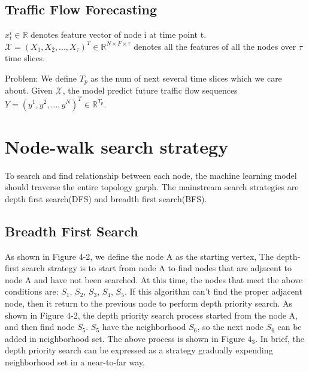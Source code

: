 \documentclass[conference]{IEEEtran}
\begin{document}
\subsection{Traffic Flow Forecasting}\label{AA}
\begin{math} x^i_t\in \mathbb{R}   \end{math} denotes feature vector of node i at time point t. \begin{math} \mathcal{X} = (X_1,X_2, ...,X_\tau)^T \in \mathbb{R}^{N\times F\times\tau}\end{math} denotes all the features of all the nodes over $\tau$ time slices.
\par Problem: We define $T_p$ as the num of next several time slices which we care about. Given $\mathcal{X}$, the model predict future traffic flow sequences $Y = (y^1,y^2,...,y^N)^T \in \mathbb{R} ^{T_p}$.

\section{Node-walk search strategy}
To search and find relationship between each node, the machine learning model should traverse the entire topology garph. The mainstream search strategies are depth first search(DFS) and breadth first search(BFS).

\subsection{Breadth First Search}
\par
As shown in Figure 4-2, we define the node A as the starting vertex, The depth-first search strategy is to start from node A to find nodes that are adjacent to node A and have not been searched. At this time, the nodes that meet the above conditions are: $S_1$, $S_2$, $S_3$, $S_4$, $S_5$. If this algorithm can't find the proper adjacent node, then it return to the previous node to perform depth priority search. As shown in Figure 4-2, the depth priority search process started from the node A, and then find node $S_5$. $S_5$ have the neighborhood $S_6$, so the next node $S_6$ can be added in neighborhood set. The above process is shown in Figure $4_3$. In brief, the depth priority search can be expressed as a strategy gradually expending neighborhood set in a near-to-far way.
\end{document}
